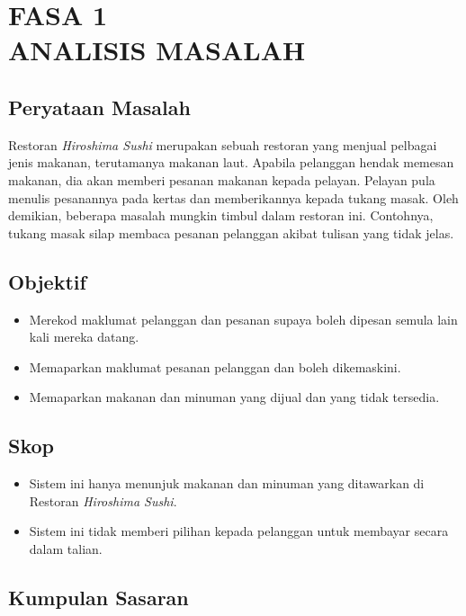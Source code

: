 \documentclass[main.tex]{subfiles}
\begin{document}
\newpage
\section{FASA 1 \\[1em] ANALISIS MASALAH}

\subsection{Peryataan Masalah}

Restoran \textit{Hiroshima Sushi} merupakan sebuah restoran yang menjual pelbagai jenis makanan, terutamanya makanan laut. Apabila pelanggan hendak memesan makanan, dia akan memberi pesanan makanan kepada pelayan. Pelayan pula menulis pesanannya pada kertas dan memberikannya kepada tukang masak. Oleh demikian, beberapa masalah mungkin timbul dalam restoran ini. Contohnya, tukang masak silap membaca pesanan pelanggan akibat tulisan yang tidak jelas.

\subsection{Objektif}

\begin{itemize}
    \item Merekod maklumat pelanggan dan pesanan supaya boleh dipesan semula lain kali mereka datang.
    \item Memaparkan maklumat pesanan pelanggan dan boleh dikemaskini.
    \item Memaparkan makanan dan minuman yang dijual dan yang tidak tersedia.
\end{itemize}

\subsection{Skop}

\begin{itemize}
    \item Sistem ini hanya menunjuk makanan dan minuman yang ditawarkan di Restoran \textit{Hiroshima Sushi}.
    \item Sistem ini tidak memberi pilihan kepada pelanggan untuk membayar secara dalam talian.
\end{itemize}

\subsection{Kumpulan Sasaran}
\end{document}
